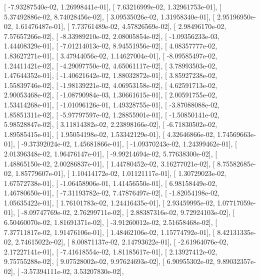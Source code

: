 \documentclass{article}
\begin{document}
       [ -7.93287540e-02,   1.26998441e-01],
       [  7.63216999e-02,   1.32961753e-01],
       [  5.37492886e-02,   8.74028456e-02],
       [  3.09535026e-02,   1.31958340e-01],
       [  2.95196950e-02,   1.61476487e-01],
       [  7.73761489e-02,   4.57826569e-02],
       [  2.98496170e-02,   7.57657266e-02],
       [ -8.33989210e-02,   2.08005854e-02],
       [ -1.09356233e-03,   1.44408329e-01],
       [ -7.01214013e-02,   8.94551956e-02],
       [  4.08357777e-02,   1.83627271e-01],
       [  3.47944056e-02,   1.14627004e-01],
       [ -8.09585497e-02,   1.24411421e-02],
       [ -4.29097750e-02,   4.65061117e-02],
       [  3.78993503e-02,   1.47644352e-01],
       [ -1.40621642e-02,   1.88032872e-01],
       [  3.85927238e-02,   1.55839746e-02],
       [ -1.98139221e-02,   4.06953158e-02],
       [  4.62591713e-02,   2.90053468e-02],
       [ -1.08790984e-03,   1.30661615e-01],
       [  2.00591755e-02,   1.53414268e-01],
       [ -1.01096126e-01,   1.49328755e-01],
       [ -3.87088088e-02,   1.85851311e-02],
       [ -5.97797597e-02,   1.28855901e-01],
       [ -1.50850141e-02,   5.98528847e-02],
       [  3.11814382e-02,   2.23898166e-02],
       [ -6.71830502e-02,   1.89585415e-01],
       [  1.95054198e-02,   1.53342129e-01],
       [  4.32646866e-02,   1.74569663e-01],
       [ -9.37392024e-02,   1.45681866e-01],
       [ -1.09370243e-02,   1.24399462e-01],
       [  2.01396348e-02,   1.96476147e-01],
       [ -9.99214694e-02,   5.77638300e-02],
       [  1.48865150e-02,   2.00286837e-01],
       [  1.44780452e-02,   3.16277021e-02],
       [  8.75582685e-02,   1.85779607e-01],
       [  1.10414172e-02,   1.01121117e-01],
       [  1.30729023e-02,   1.67572738e-01],
       [ -1.06458906e-01,   1.41456550e-01],
       [  6.98158449e-02,   1.46780650e-01],
       [ -7.31193782e-02,   7.47876497e-02],
       [ -1.82054198e-02,   1.05635422e-01],
       [  1.76101783e-02,   1.24416435e-01],
       [  2.93459995e-02,   1.07717059e-01],
       [ -8.09747769e-02,   2.76299711e-02],
       [  2.88387316e-02,   9.72924103e-02],
       [  6.50460070e-02,   1.81691371e-02],
       [ -3.91260012e-02,   2.51658468e-02],
       [  7.37711817e-02,   1.91476106e-01],
       [  1.48462106e-02,   1.15774792e-01],
       [  8.42131335e-02,   2.74615022e-02],
       [  8.00871137e-02,   2.14793622e-01],
       [ -2.61964076e-02,   2.17227141e-01],
       [ -7.41618554e-02,   1.81185617e-01],
       [  2.13927412e-02,   9.75755288e-02],
       [  9.07528002e-02,   9.97624693e-02],
       [  6.90955302e-02,   9.89032357e-02],
       [ -3.57394111e-02,   3.53207830e-02],
\end{document}
